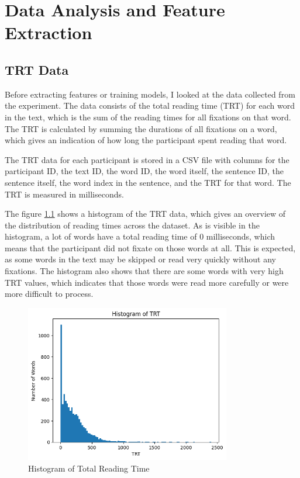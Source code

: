 \chapter{Data Analysis and Feature Extraction}

\section{TRT Data}
Before extracting features or training models, I looked at the data collected from the experiment. The data consists of the total reading time (TRT) for each word in the text, which is the sum of the reading times for all fixations on that word. The TRT is calculated by summing the durations of all fixations on a word, which gives an indication of how long the participant spent reading that word.

The TRT data for each participant is stored in a CSV file with columns for the participant ID, the text ID, the word ID, the word itself, the sentence ID, the sentence itself, the word index in the sentence, and the TRT for that word. The TRT is measured in milliseconds. 

The figure \ref{fig:trt_data} shows a histogram of the TRT data, which gives an overview of the distribution of reading times across the dataset. As is visible in the histogram, a lot of words have a total reading time of 0 milliseconds, which means that the participant did not fixate on those words at all. This is expected, as some words in the text may be skipped or read very quickly without any fixations. The histogram also shows that there are some words with very high TRT values, which indicates that those words were read more carefully or were more difficult to process.

\begin{figure}
    \centering
    \includegraphics[width=0.8\textwidth]{images/TRT_histogram.png}
    \caption{Histogram of Total Reading Time}
    \label{fig:trt_data}
\end{figure}

